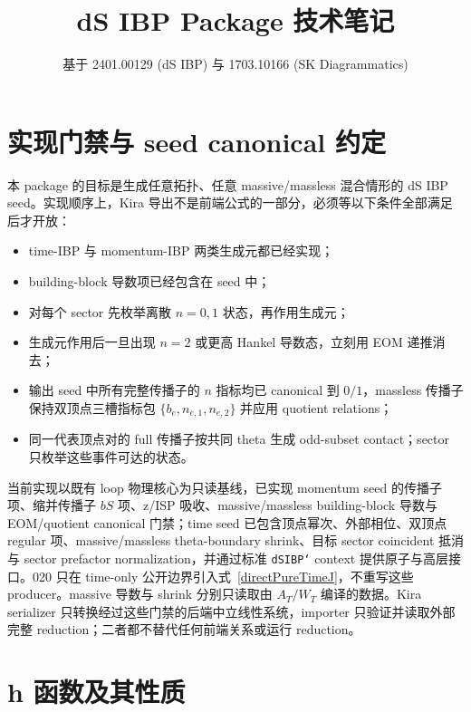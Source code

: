 ﻿\documentclass[a4paper,11pt]{article}
\title{dS IBP Package 技术笔记}
\author{基于 2401.00129 (dS IBP) 与 1703.10166 (SK Diagrammatics)}
\begin{document}
\sloppy
\maketitle
\tableofcontents
\newpage

\section{实现门禁与 seed canonical 约定}

本 package 的目标是生成任意拓扑、任意 massive/massless 混合情形的 dS IBP seed。实现顺序上，Kira 导出不是前端公式的一部分，必须等以下条件全部满足后才开放：
\begin{itemize}
  \item time-IBP 与 momentum-IBP 两类生成元都已经实现；
  \item building-block 导数项已经包含在 seed 中；
  \item 对每个 sector 先枚举离散 $n=0,1$ 状态，再作用生成元；
  \item 生成元作用后一旦出现 $n=2$ 或更高 Hankel 导数态，立刻用 EOM 递推消去；
  \item 输出 seed 中所有完整传播子的 $n$ 指标均已 canonical 到 $0/1$，massless 传播子保持双顶点三槽指标包 $\{b_e,n_{e,1},n_{e,2}\}$ 并应用 quotient relations；
  \item 同一代表顶点对的 full 传播子按共同 theta 生成 odd-subset contact；sector 只枚举这些事件可达的状态。
\end{itemize}

当前实现以既有 loop 物理核心为只读基线，已实现 momentum seed 的传播子项、缩并传播子 $bS$ 项、z/ISP 吸收、massive/massless building-block 导数与 EOM/quotient canonical 门禁；time seed 已包含顶点幂次、外部相位、双顶点 regular 项、massive/massless theta-boundary shrink、目标 sector coincident 抵消与 sector prefactor normalization，并通过标准 \texttt{dSIBP`} context 提供原子与高层接口。020 只在 time-only 公开边界引入式~\eqref{directPureTimeJ}，不重写这些 producer。massive 导数与 shrink 分别只读取由 $A_T/W_T$ 编译的数据。Kira serializer 只转换经过这些门禁的后端中立线性系统，importer 只验证并读取外部完整 reduction；二者都不替代任何前端关系或运行 reduction。

\section{h 函数及其性质}
\end{document}
